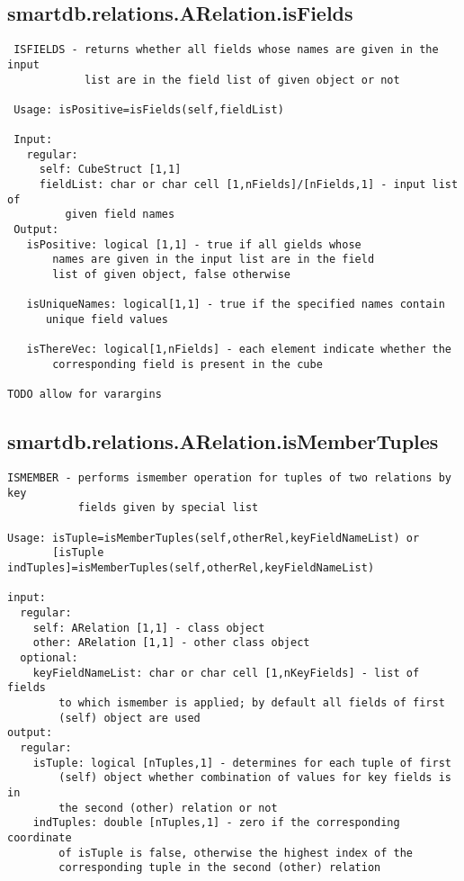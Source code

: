 \subsection{\texorpdfstring{smartdb.relations.ARelation.isFields}{isFields}}\label{method:smartdb.relations.ARelation.isFields}
\begin{verbatim}
 ISFIELDS - returns whether all fields whose names are given in the input
            list are in the field list of given object or not

 Usage: isPositive=isFields(self,fieldList)

 Input:
   regular:
     self: CubeStruct [1,1]
     fieldList: char or char cell [1,nFields]/[nFields,1] - input list of
         given field names
 Output:
   isPositive: logical [1,1] - true if all gields whose
       names are given in the input list are in the field
       list of given object, false otherwise

   isUniqueNames: logical[1,1] - true if the specified names contain
      unique field values

   isThereVec: logical[1,nFields] - each element indicate whether the
       corresponding field is present in the cube

TODO allow for varargins
\end{verbatim}
\subsection{\texorpdfstring{smartdb.relations.ARelation.isMemberTuples}{isMemberTuples}}\label{method:smartdb.relations.ARelation.isMemberTuples}
\begin{verbatim}
ISMEMBER - performs ismember operation for tuples of two relations by key
           fields given by special list

Usage: isTuple=isMemberTuples(self,otherRel,keyFieldNameList) or
       [isTuple indTuples]=isMemberTuples(self,otherRel,keyFieldNameList)

input:
  regular:
    self: ARelation [1,1] - class object
    other: ARelation [1,1] - other class object
  optional:
    keyFieldNameList: char or char cell [1,nKeyFields] - list of fields
        to which ismember is applied; by default all fields of first
        (self) object are used
output:
  regular:
    isTuple: logical [nTuples,1] - determines for each tuple of first
        (self) object whether combination of values for key fields is in
        the second (other) relation or not
    indTuples: double [nTuples,1] - zero if the corresponding coordinate
        of isTuple is false, otherwise the highest index of the
        corresponding tuple in the second (other) relation
\end{verbatim}
